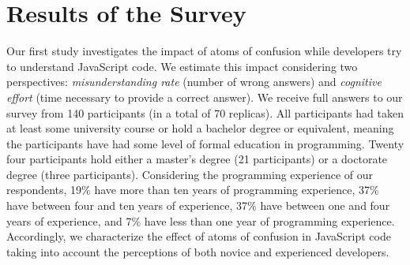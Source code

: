 

\section{Results of the Survey}
\label{sec:survey-resuts} 

Our first study investigates the impact of atoms of confusion while developers try to understand JavaScript code.
We estimate this impact considering two perspectives: \emph{misunderstanding rate} (number of wrong answers)
and \emph{cognitive effort} (time necessary to provide a correct answer). We receive full answers to our survey
from 140 participants (in a total of 70 replicas).
All participants had taken at least some university course or hold a bachelor
degree or equivalent, meaning the participants have had some level of formal education in programming. Twenty four participants hold either a master's degree (21 participants) or a doctorate degree (three participants). 
Considering the programming experience of our respondents, 19\% have more than ten years of programming experience, 37\% have between four and ten years of experience, 37\% have between one and four years of experience, and 7\% have less than one year of programming experience.  
Accordingly, we characterize the effect of atoms of confusion in JavaScript
code taking into account the perceptions of both novice and experienced developers. 





